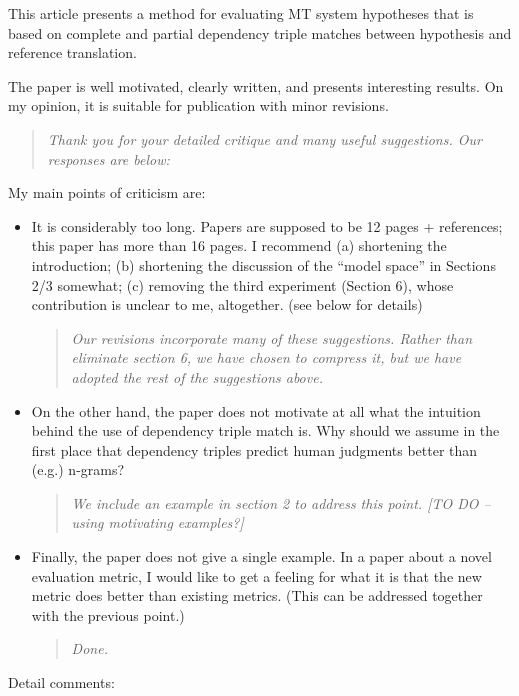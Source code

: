 \documentclass[letterpaper,12pt]{article}
\newenvironment{response}
{\begin{quotation} \it}
  {\end{quotation}}
\begin{document}
This article presents a method for evaluating MT system hypotheses
that is based on complete and partial dependency triple matches
between hypothesis and reference translation.

The paper is well motivated, clearly written, and presents interesting
results. On my opinion, it is suitable for publication with minor
revisions. 
\begin{response}
  Thank you for your detailed critique and many useful
  suggestions. Our responses are below:
\end{response}
My main points of criticism are:

\begin{itemize}
\item It is considerably too long. Papers are supposed to be 12 pages
  + references; this paper has more than 16 pages. I recommend (a)
  shortening the introduction; (b) shortening the discussion of the
  ``model space'' in Sections 2/3 somewhat; (c) removing the third
  experiment (Section 6), whose contribution is unclear to me,
  altogether. (see below for details)
  \begin{response}
    Our revisions incorporate many of these suggestions. Rather than
    eliminate section 6, we have chosen to compress it, but we have
    adopted the rest of the suggestions above.
  \end{response}

\item On the other hand, the paper does not motivate at all what the
  intuition behind the use of dependency triple match is. Why should
  we assume in the first place that dependency triples predict human
  judgments better than (e.g.) n-grams?
  \begin{response}
    We include an example in section 2 to address this point.  [TO DO
    -- using motivating examples?]
  \end{response}

\item Finally, the paper does not give a single example. In a paper
  about a novel evaluation metric, I would like to get a feeling for
  what it is that the new metric does better than existing
  metrics. (This can be addressed together with the previous point.)
  \begin{response}
    Done.
  \end{response}
\end{itemize}

Detail comments:
\end{document}
